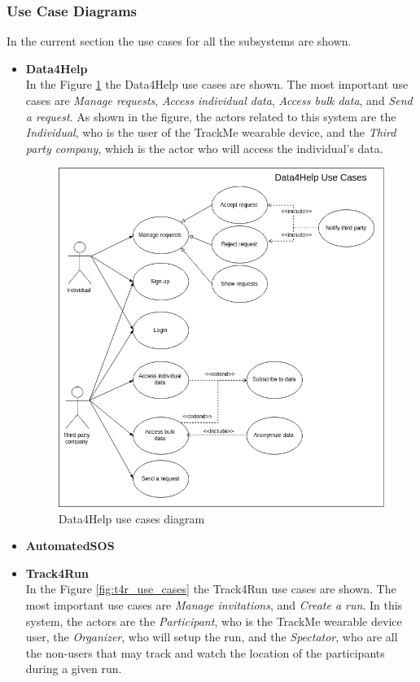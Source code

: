 \documentclass[12pt]{article}
\begin{document}
\subsubsection{Use Case Diagrams}
In the current section the use cases for all the subsystems are shown.

\begin{itemize}
\item{\textbf{Data4Help}} \\
In the Figure \ref{fig:d4h_use_cases} the Data4Help use cases are shown. The most important use cases are \textit{Manage requests}, \textit{Access individual data}, \textit{Access bulk data}, and \textit{Send a request}. As shown in the figure, the actors related to this system are the \textit{Individual}, who is the user of the TrackMe wearable device, and the \textit{Third party company}, which is the actor who will access the individual's data.

\begin{figure}[H]
\centering
	\includegraphics[scale=0.6]{Diagrams/d4h_use_cases.png}
\caption[Data4Help use cases]{Data4Help use cases diagram}
\label{fig:d4h_use_cases}
\end{figure}

\item{\textbf{AutomatedSOS}}\\
\item{\textbf{Track4Run}}\\
In the Figure \ref{fig:t4r_use_cases} the Track4Run use cases are shown. The most important use cases are \textit{Manage invitations}, and \textit{Create a run}. In this system, the actors are the \textit{Participant}, who is the TrackMe wearable device user, the \textit{Organizer}, who will setup the run, and the \textit{Spectator}, who are all the non-users that may track and watch the location of the participants during a given run.


\end{itemize}
\end{document}
